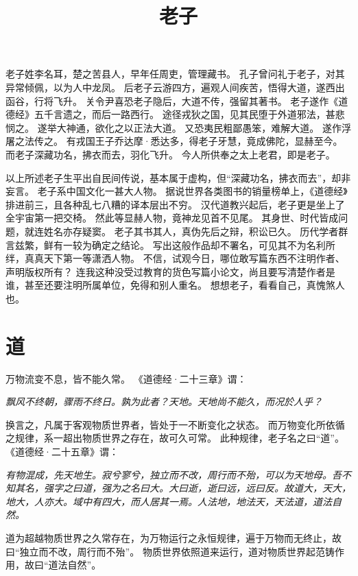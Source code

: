 \documentclass[11pt]{article}
\title{老子}
\date{}
\begin{document}
  \maketitle
  
  \linenumbers

老子姓李名耳，楚之苦县人，早年任周吏，管理藏书。
孔子曾问礼于老子，对其异常倾佩，以为人中龙凤。
后老子云游四方，遍观人间疾苦，悟得大道，遂西出函谷，行将飞升。
关令尹喜恐老子隐后，大道不传，强留其著书。
老子遂作《道德经》五千言遗之，而后一路西行。
途径戎狄之国，见其民堕于外道邪法，甚悲悯之。
遂举大神通，欲化之以正法大道。
又恐夷民粗鄙愚笨，难解大道。
遂作浮屠之法传之。
有戎国王子乔达摩·悉达多，得老子牙慧，竟成佛陀，显赫至今。
而老子深藏功名，拂衣而去，羽化飞升。
今人所供奉之太上老君，即是老子。

\newline

以上所述老子生平出自民间传说，基本属于虚构，但“深藏功名，拂衣而去”，却非妄言。
老子系中国文化一甚大人物。
据说世界各类图书的销量榜单上，《道德经》排进前三，且各种乱七八糟的译本层出不穷。
汉代道教兴起后，老子更是坐上了全宇宙第一把交椅。
然此等显赫人物，竟神龙见首不见尾。
其身世、时代皆成问题，就连姓名亦存疑窦。
老子其书其人，真伪先后之辩，积讼已久。
历代学者群言兹繁，鲜有一较为确定之结论。
写出这般作品却不署名，可见其不为名利所绊，真真天下第一等潇洒人物。
不信，试观今日，哪位敢写篇东西不注明作者、声明版权所有？
连我这种没受过教育的货色写篇小论文，尚且要写清楚作者是谁，甚至还要注明所属单位，免得和别人重名。
想想老子，看看自己，真愧煞人也。

\newline

\section{道}
万物流变不息，皆不能久常。
《道德经·二十三章》谓：

\textit{飘风不终朝，骤雨不终日。孰为此者？天地。天地尚不能久，而况於人乎？}

换言之，凡属于客观物质世界者，皆处于一不断变化之状态。
而万物变化所依循之规律，系一超出物质世界之存在，故可久可常。
此种规律，老子名之曰“道”。
《道德经·二十五章》谓：

\textit{有物混成，先天地生。寂兮寥兮，独立而不改，周行而不殆，可以为天地母。吾不知其名，强字之曰道，强为之名曰大。大曰逝，逝曰远，远曰反。故道大，天大，地大，人亦大。域中有四大，而人居其一焉。人法地，地法天，天法道，道法自然。}

道为超越物质世界之久常存在，为万物运行之永恒规律，遍于万物而无终止，故曰“独立而不改，周行而不殆”。
物质世界依照道来运行，道对物质世界起范铸作用，故曰“道法自然”。
\end{document}
